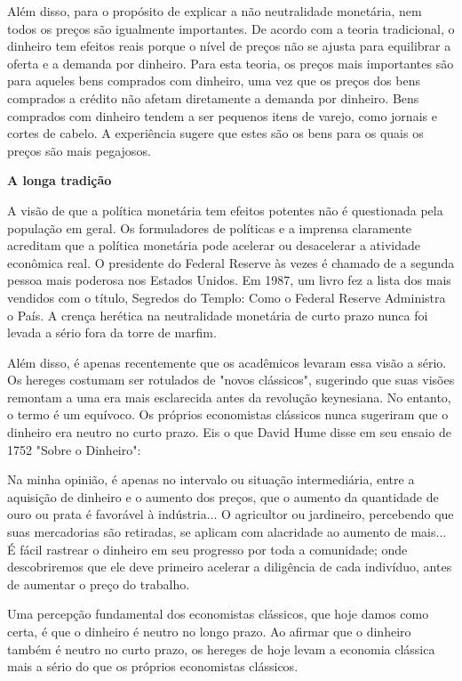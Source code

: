 \documentclass[a4paper,12pt]{article}[abntex2]
\begin{document}
Além disso, para o propósito de explicar a não neutralidade monetária, nem todos os preços são igualmente importantes. De acordo com a teoria tradicional, o dinheiro tem efeitos reais porque o nível de preços não se ajusta para equilibrar a oferta e a demanda por dinheiro. Para esta teoria, os preços mais importantes são para aqueles bens comprados com dinheiro, uma vez que os preços dos bens comprados a crédito não afetam diretamente a demanda por dinheiro. Bens comprados com dinheiro tendem a ser pequenos itens de varejo, como jornais e cortes de cabelo. A experiência sugere que estes são os bens para os quais os preços são mais pegajosos.

\textbf{A longa tradição}

A visão de que a política monetária tem efeitos potentes não é questionada pela população em geral. Os formuladores de políticas e a imprensa claramente acreditam que a política monetária pode acelerar ou desacelerar a atividade econômica real. O presidente do Federal Reserve às vezes é chamado de a segunda pessoa mais poderosa nos Estados Unidos. Em 1987, um livro fez a lista dos mais vendidos com o título, Segredos do Templo: Como o Federal Reserve Administra o País. A crença herética na neutralidade monetária de curto prazo nunca foi levada a sério fora da torre de marfim.

Além disso, é apenas recentemente que os acadêmicos levaram essa visão a sério. Os hereges costumam ser rotulados de "novos clássicos", sugerindo que suas visões remontam a uma era mais esclarecida antes da revolução keynesiana. No entanto, o termo é um equívoco. Os próprios economistas clássicos nunca sugeriram que o dinheiro era neutro no curto prazo. Eis o que David Hume disse em seu ensaio de 1752 "Sobre o Dinheiro":

Na minha opinião, é apenas no intervalo ou situação intermediária, entre a aquisição de dinheiro e o aumento dos preços, que o aumento da quantidade de ouro ou prata é favorável à indústria... O agricultor ou jardineiro, percebendo que suas mercadorias são retiradas, se aplicam com alacridade ao aumento de mais... É fácil rastrear o dinheiro em seu progresso por toda a comunidade; onde descobriremos que ele deve primeiro acelerar a diligência de cada indivíduo, antes de aumentar o preço do trabalho.

Uma percepção fundamental dos economistas clássicos, que hoje damos como certa, é que o dinheiro é neutro no longo prazo. Ao afirmar que o dinheiro também é neutro no curto prazo, os hereges de hoje levam a economia clássica mais a sério do que os próprios economistas clássicos.
\end{document}
